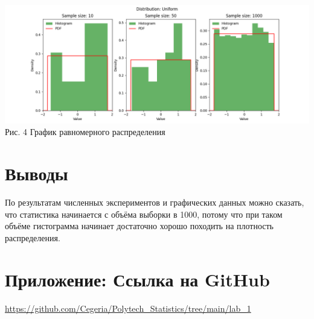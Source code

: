 \documentclass[12pt]{article}
\begin{document}
\begin{center}
    \includegraphics[scale=0.6]{lab_1_Uniform.png} \\
    Рис. 4 График равномерного распределения
\end{center}

\section{Выводы}
По результатам численных экспериментов и графических данных можно сказать, что статистика начинается с объёма выборки в 1000, потому что при таком объёме гистограмма начинает достаточно хорошо походить на плотность распределения.
\section*{Приложение: Ссылка на GitHub}
\url{https://github.com/Cegeria/Polytech\_Statistics/tree/main/lab\_1}
\end{document}
